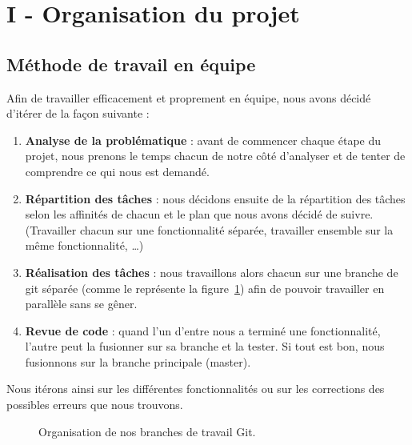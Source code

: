 \vspace*{-0.9cm}
\section*{I - Organisation du projet}
\subsection*{Méthode de travail en équipe}
Afin de travailler efficacement et proprement en équipe, nous avons décidé d'itérer de la façon suivante :
\begin{enumerate}
    \item \textbf{Analyse de la problématique} : avant de commencer chaque étape du projet, nous prenons le temps chacun de notre côté d'analyser et de tenter de comprendre ce qui nous est demandé.
    \item \textbf{Répartition des tâches} : nous décidons ensuite de la répartition des tâches selon les affinités de chacun et le plan que nous avons décidé de suivre.
    (Travailler chacun sur une fonctionnalité séparée, travailler ensemble sur la même fonctionnalité, \ldots)
    \item \textbf{Réalisation des tâches} : nous travaillons alors chacun sur une branche de git séparée (comme le représente la figure~\ref{fig:git_organisation}) afin de pouvoir travailler en parallèle sans se gêner.
    \item \textbf{Revue de code} : quand l'un d'entre nous a terminé une fonctionnalité, l'autre peut la fusionner sur sa branche et la tester.
    Si tout est bon, nous fusionnons sur la branche principale (master).
\end{enumerate}
Nous itérons ainsi sur les différentes fonctionnalités ou sur les corrections des possibles erreurs que nous trouvons.

\begin{figure}[h!]
    \centering
    \caption{Organisation de nos branches de travail Git.}
    \label{fig:git_organisation}
\end{figure}

